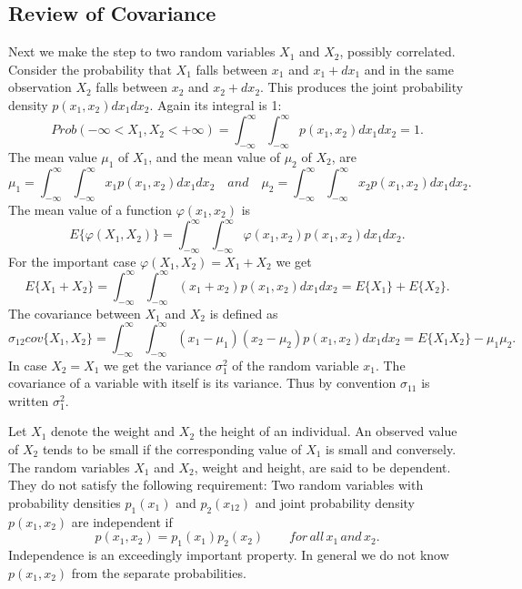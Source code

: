 	\subsection{Review of Covariance}
	Next we make the step to two random variables $X_1$ and $X_2$, possibly correlated. Consider
	the probability that $X_1$ falls between $x_1$ and $x_1+dx_1$ and in the same observation $X_2$ falls between $x_2$ and $x_2+dx_2$. This produces the joint probability density $p(x_1,x_2)dx_1dx_2$. Again its integral is 1:
	\begin{equation}
	Prob(-\infty<X_1,X_2<+\infty)=\int^\infty_{-\infty}\int^\infty_{-\infty}p(x_1,x_2)dx_1dx_2=1.
	\end{equation}
	The mean value $\mu_1$ of $X_1$, and the mean value of $\mu_2$ of $X_2$, are
	\begin{equation*}
	\mu_1=\int^\infty_{-\infty}\int^\infty_{-\infty}x_1p(x_1,x_2)dx_1dx_2
	\quad and \quad
	\mu_2=\int^\infty_{-\infty}\int^\infty_{-\infty}x_2p(x_1,x_2)dx_1dx_2.
	\end{equation*}
	The mean value of a function $\varphi(x_1,x_2)$ is
	\begin{equation}
	E\{\varphi(X_1,X_2)\}=\int^\infty_{-\infty}\int^\infty_{-\infty}\varphi(x_1,x_2)p(x_1,x_2)dx_1dx_2.
	\end{equation}
	For the important case $\varphi(X_1,X_2)=X_1+X_2$ we get
	\begin{equation}
	E\{X_1+X_2\}=\int^\infty_{-\infty}\int^\infty_{-\infty}(x_1+x_2)p(x_1,x_2)dx_1dx_2=E\{X_1\}+E\{X_2\}.
	\end{equation}
	The covariance between $X_1$ and $X_2$ is defined as
	\begin{equation}
	\sigma_{12}cov\{X_1,X_2\}=\int^\infty_{-\infty}\int^\infty_{-\infty}(x_1-\mu_1)(x_2-\mu_2)p(x_1,x_2)dx_1dx_2=E\{X_1X_2\}-\mu_1\mu_2.
	\end{equation}
	In case $X_2=X_1$ we get the variance $\sigma^2_1$ of the random variable $x_1$. The covariance of a variable with itself is its variance. Thus by convention $\sigma_{11}$ is written $\sigma^2_1$.
	
	Let $X_1$  denote the weight and $X_2$ the height of an individual. An observed value
	of $X_2$ tends to be small if the corresponding value of $X_1$ is small and conversely. The
	random variables $X_1$ and $X_2$, weight and height, are said to be dependent. They do not
	satisfy the following requirement: Two random variables with probability densities $p_1(x_1)$
	and $p_2(x_12)$ and joint probability density $p(x_1,x_2)$ are independent if
	\begin{equation}
	p(x_1,x_2)=p_1(x_1)p_2(x_2) \qquad for\,all\,x_1\,and\,x_2.
	\end{equation}
	Independence is an exceedingly important property. In general we do not know $p(x_1,x_2)$
	from the separate probabilities.
	
